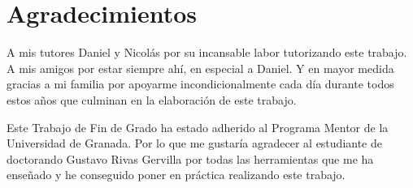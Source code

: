 %
\thispagestyle{empty}


\chapter*{Agradecimientos}\bigskip

A mis tutores Daniel y Nicolás por su incansable labor tutorizando este trabajo.  A mis amigos por estar siempre ahí, en especial  a Daniel. Y en mayor medida gracias a mi familia por apoyarme incondicionalmente cada día durante todos estos años que culminan en la elaboración de este trabajo.


Este Trabajo de Fin de Grado ha estado adherido al Programa Mentor de la Universidad de Granada. Por lo que me gustaría agradecer al estudiante de doctorando Gustavo Rivas Gervilla por todas las herramientas que me ha enseñado y he conseguido poner en práctica realizando este trabajo.
\medskip

\vfill

\cleardoublepage
\endinput
